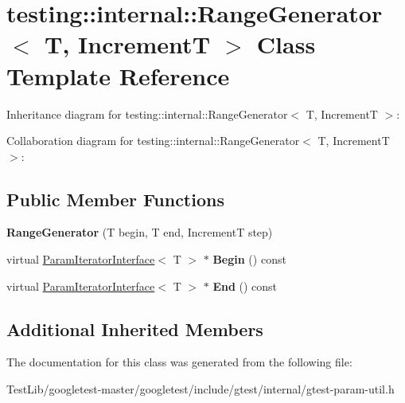 \hypertarget{classtesting_1_1internal_1_1RangeGenerator}{}\section{testing\+:\+:internal\+:\+:Range\+Generator$<$ T, IncrementT $>$ Class Template Reference}
\label{classtesting_1_1internal_1_1RangeGenerator}


Inheritance diagram for testing\+:\+:internal\+:\+:Range\+Generator$<$ T, IncrementT $>$\+:


Collaboration diagram for testing\+:\+:internal\+:\+:Range\+Generator$<$ T, IncrementT $>$\+:
\subsection*{Public Member Functions}
\begin{DoxyCompactItemize}
\item 
\mbox{\label{classtesting_1_1internal_1_1RangeGenerator_a5b3b83223b9cada3569bcee729e0fdf3}} 
{\bfseries Range\+Generator} (T begin, T end, IncrementT step)
\item 
\mbox{\label{classtesting_1_1internal_1_1RangeGenerator_ae68b59f9348ecf93e0947545a2424765}} 
virtual \hyperlink{classtesting_1_1internal_1_1ParamIteratorInterface}{Param\+Iterator\+Interface}$<$ T $>$ $\ast$ {\bfseries Begin} () const
\item 
\mbox{\label{classtesting_1_1internal_1_1RangeGenerator_a8d2acbb733791a14df6e7bd3754e9003}} 
virtual \hyperlink{classtesting_1_1internal_1_1ParamIteratorInterface}{Param\+Iterator\+Interface}$<$ T $>$ $\ast$ {\bfseries End} () const
\end{DoxyCompactItemize}
\subsection*{Additional Inherited Members}


The documentation for this class was generated from the following file\+:\begin{DoxyCompactItemize}
\item 
Test\+Lib/googletest-\/master/googletest/include/gtest/internal/gtest-\/param-\/util.\+h\end{DoxyCompactItemize}
